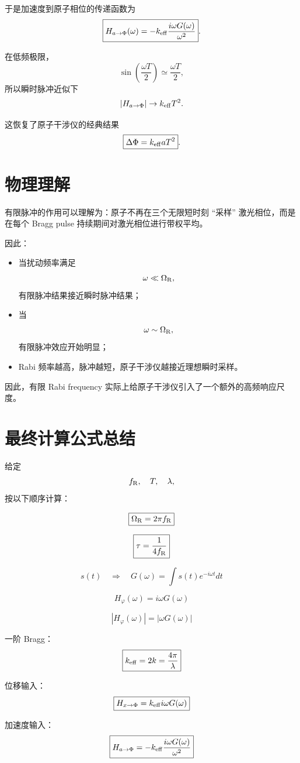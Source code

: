 \documentclass[UTF8,12pt,a4paper,fontset=fandol]{ctexart}
\begin{document}
于是加速度到原子相位的传递函数为
\[
\boxed{
H_{a\rightarrow\Phi}(\omega)
=
-k_{\rm eff}
\frac{i\omega G(\omega)}{\omega^2}
}.
\]

在低频极限，
\[
\sin\left(\frac{\omega T}{2}\right)
\simeq
\frac{\omega T}{2},
\]
所以瞬时脉冲近似下
\[
|H_{a\rightarrow\Phi}|
\rightarrow
k_{\rm eff}T^2.
\]

这恢复了原子干涉仪的经典结果
\[
\boxed{
\Delta\Phi
=
k_{\rm eff}aT^2
}.
\]

\section{物理理解}

有限脉冲的作用可以理解为：原子不再在三个无限短时刻 ``采样'' 激光相位，而是在每个 Bragg pulse 持续期间对激光相位进行带权平均。

因此：

\begin{itemize}[leftmargin=2em]
\item 当扰动频率满足
\[
\omega\ll\Omega_{\rm R},
\]
有限脉冲结果接近瞬时脉冲结果；
\item 当
\[
\omega\sim\Omega_{\rm R},
\]
有限脉冲效应开始明显；
\item Rabi 频率越高，脉冲越短，原子干涉仪越接近理想瞬时采样。
\end{itemize}

因此，有限 Rabi frequency 实际上给原子干涉仪引入了一个额外的高频响应尺度。

\section{最终计算公式总结}

给定
\[
f_{\rm R},\quad T,\quad \lambda,
\]
按以下顺序计算：

\[
\boxed{
\Omega_{\rm R}=2\pi f_{\rm R}
}
\]

\[
\boxed{
\tau=\frac{1}{4f_{\rm R}}
}
\]

\[
\boxed{
s(t)
\quad\Longrightarrow\quad
G(\omega)=\int s(t)e^{-i\omega t}dt
}
\]

\[
\boxed{
H_\varphi(\omega)=i\omega G(\omega)
}
\]

\[
\boxed{
|H_\varphi(\omega)|
=
|\omega G(\omega)|
}
\]

一阶 Bragg：
\[
\boxed{
k_{\rm eff}=2k=\frac{4\pi}{\lambda}
}
\]

位移输入：
\[
\boxed{
H_{x\rightarrow\Phi}
=
k_{\rm eff}i\omega G(\omega)
}
\]

加速度输入：
\[
\boxed{
H_{a\rightarrow\Phi}
=
-k_{\rm eff}
\frac{i\omega G(\omega)}{\omega^2}
}
\]
\end{document}
